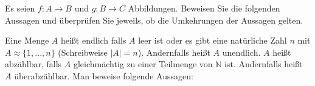 \documentclass[10pt, a4paper]{exam}
\begin{document}
\begin{questions}

    \question Es seien $f:A\rightarrow B$ und $g:B\rightarrow C$ Abbildungen. Beweisen Sie die folgenden Aussagen und überprüfen Sie jeweils, ob die Umkehrungen der Aussagen gelten.

    \question Eine Menge $A$ heißt endlich falls $A$ leer ist oder es gibt eine natürliche Zahl $n$ mit $A\approx\{1, ..., n\}$ (Schreibweise $|A| = n$). Andernfalls heißt $A$ unendlich. $A$ heißt abzählbar, falls $A$ gleichmächtig zu einer Teilmenge von $\mathbb{N}$ ist. Andernfalls heißt $A$ überabzählbar. Man beweise folgende Aussagen:
\end{questions}
\end{document}
